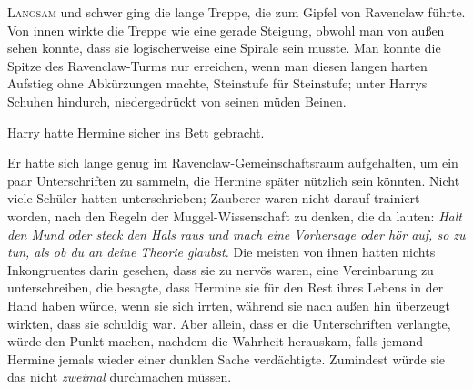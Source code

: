 
\lettrine{L}{angsam} und schwer ging die lange Treppe, die zum Gipfel von Ravenclaw führte. Von innen wirkte die Treppe wie eine gerade Steigung, obwohl man von außen sehen konnte, dass sie logischerweise eine Spirale sein musste. Man konnte die Spitze des Ravenclaw-Turms nur erreichen, wenn man diesen langen harten Aufstieg ohne Abkürzungen machte, Steinstufe für Steinstufe; unter Harrys Schuhen hindurch, niedergedrückt von seinen müden Beinen.

Harry hatte Hermine sicher ins Bett gebracht.

Er hatte sich lange genug im Ravenclaw-Gemeinschaftsraum aufgehalten, um ein paar Unterschriften zu sammeln, die Hermine später nützlich sein könnten. Nicht viele Schüler hatten unterschrieben; Zauberer waren nicht darauf trainiert worden, nach den Regeln der Muggel-Wissenschaft zu denken, die da lauten: \emph{Halt den Mund oder steck den Hals raus und mach eine Vorhersage oder hör auf, so zu tun, als ob du an deine Theorie glaubst.} Die meisten von ihnen hatten nichts Inkongruentes darin gesehen, dass sie zu nervös waren, eine Vereinbarung zu unterschreiben, die besagte, dass Hermine sie für den Rest ihres Lebens in der Hand haben würde, wenn sie sich irrten, während sie nach außen hin überzeugt wirkten, dass sie schuldig war. Aber allein, dass er die Unterschriften verlangte, würde den Punkt machen, nachdem die Wahrheit herauskam, falls jemand Hermine jemals wieder einer dunklen Sache verdächtigte. Zumindest würde sie das nicht \emph{zweimal} durchmachen müssen.

